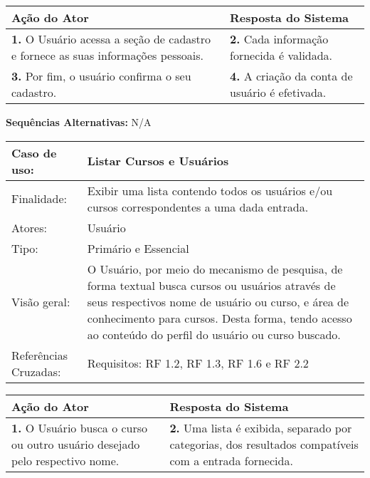 \documentclass[12pt,a4paper,onecolumn,titlepage]{article}
\begin{document}
\begin{center}
\def\arraystretch{1.1}
\begin{tabular}{|p{6cm}|p{6cm}|}

\hline
\textbf{Ação do Ator} & \textbf{Resposta do Sistema} \\ \hline
\textbf{1.} O Usuário acessa a seção de cadastro e fornece as suas informações pessoais. & \textbf{2.} Cada informação fornecida é validada. \\ \hline
\textbf{3.} Por fim, o usuário confirma o seu cadastro. & \textbf{4.} A criação da conta de usuário é efetivada. \\ \hline
\end{tabular}
\end{center}

\textbf{Sequências Alternativas:} N/A

\newpage



\begin{table}[h!]
\begin{center}
\begin{tabular}{p{2.5cm} p{9.5cm}}
Caso de uso: & \textbf{Listar Cursos e Usuários} \\ \hline
Finalidade: & Exibir uma lista contendo todos os usuários e/ou cursos correspondentes a uma dada entrada.\\ \hline
Atores: & Usuário \\ \hline
Tipo: & Primário e Essencial\\ \hline
Visão geral: & O Usuário, por meio do mecanismo de pesquisa, de forma textual busca cursos ou usuários através de seus respectivos nome de usuário ou curso, e área de conhecimento para cursos. Desta forma, tendo acesso ao conteúdo do perfil do usuário ou curso buscado.\\ \hline
Referências Cruzadas: & Requisitos: RF 1.2, RF 1.3, RF 1.6 e RF 2.2

\end{tabular}
\end{center}
\end{table}


\begin{center}
\def\arraystretch{1.1}
\begin{tabular}{|p{6cm}|p{6cm}|}

\hline
\textbf{Ação do Ator} & \textbf{Resposta do Sistema} \\ \hline
\textbf{1.} O Usuário busca o curso ou outro usuário desejado pelo respectivo nome. & \textbf{2.} Uma lista é exibida, separado por categorias, dos resultados compatíveis com a entrada fornecida. \\ \hline
\end{tabular}
\end{center}
\end{document}
